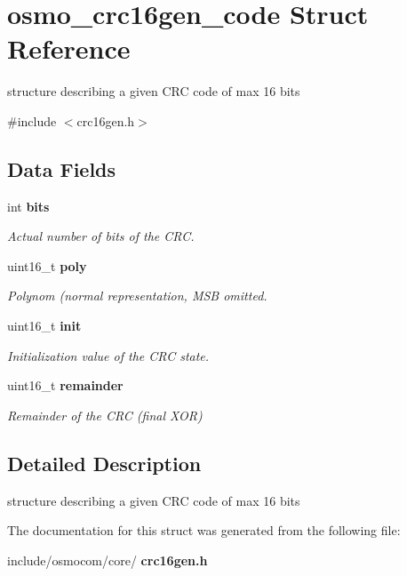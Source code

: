 \section{osmo\+\_\+crc16gen\+\_\+code Struct Reference}
\label{structosmo__crc16gen__code}


structure describing a given C\+RC code of max 16 bits  




{\ttfamily \#include $<$crc16gen.\+h$>$}

\subsection*{Data Fields}
\begin{DoxyCompactItemize}
\item 
\mbox{\label{structosmo__crc16gen__code_a96292309cf771e1086f86ccfd4bac9b2}} 
int \textbf{ bits}
\begin{DoxyCompactList}\small\item\em Actual number of bits of the C\+RC. \end{DoxyCompactList}\item 
\mbox{\label{structosmo__crc16gen__code_aedd08f5b95d016f3f09fc8bd7941c4e3}} 
uint16\+\_\+t \textbf{ poly}
\begin{DoxyCompactList}\small\item\em Polynom (normal representation, M\+SB omitted. \end{DoxyCompactList}\item 
\mbox{\label{structosmo__crc16gen__code_aecf697df2c87f82d77273fc3170f06b2}} 
uint16\+\_\+t \textbf{ init}
\begin{DoxyCompactList}\small\item\em Initialization value of the C\+RC state. \end{DoxyCompactList}\item 
\mbox{\label{structosmo__crc16gen__code_aeff1e62578a8f7b2474aa8765b9b874d}} 
uint16\+\_\+t \textbf{ remainder}
\begin{DoxyCompactList}\small\item\em Remainder of the C\+RC (final X\+OR) \end{DoxyCompactList}\end{DoxyCompactItemize}


\subsection{Detailed Description}
structure describing a given C\+RC code of max 16 bits 

The documentation for this struct was generated from the following file\+:\begin{DoxyCompactItemize}
\item 
include/osmocom/core/\textbf{ crc16gen.\+h}\end{DoxyCompactItemize}
